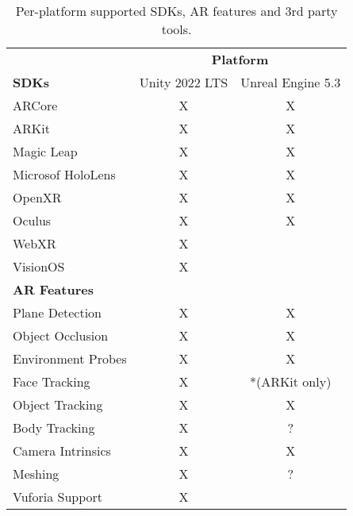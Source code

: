 \documentclass{vgtc}                          %
\begin{document}
\begin{table}[h!]
	\centering

	\begin{tabular}{l c c}
		\toprule
		                     & \multicolumn{2}{c}{\textbf{Platform}}                     \\
		\cmidrule(l){2-3}
		\textbf{SDKs}        & Unity 2022 LTS                        & Unreal Engine 5.3 \\
		\midrule
		ARCore               & X                                     & X                 \\
		ARKit                & X                                     & X                 \\
		Magic Leap           & X                                     & X                 \\
		Microsof HoloLens    & X                                     & X                 \\
		OpenXR               & X                                     & X                 \\
		Oculus               & X                                     & X                 \\
		WebXR                & X                                     &                   \\
		VisionOS             & X                                     &                   \\
		\midrule
		\textbf{AR Features} &                                       &                   \\
		\midrule
		Plane Detection      & X                                     & X                 \\
		Object Occlusion     & X                                     & X                 \\
		Environment Probes   & X                                     & X                 \\
		Face Tracking        & X                                     & *(ARKit only)     \\
		Object Tracking      & X                                     & X                 \\
		Body Tracking        & X                                     & ?                 \\
		Camera Intrinsics    & X                                     & X                 \\
		Meshing              & X                                     & ?                 \\
		\midrule
		Vuforia Support      & X                                     &                   \\
		\bottomrule
	\end{tabular}


	\medskip

	\caption{Per-platform supported SDKs, AR features and 3rd party tools.}
	\label{table:1}
\end{table}
\end{document}
